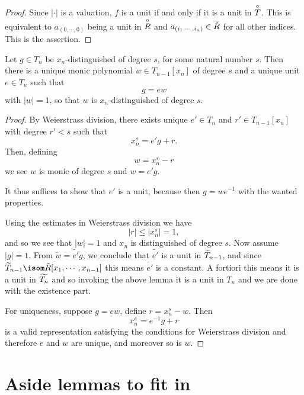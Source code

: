 \begin{proof}
  Since $\lvert \cdot \rvert$ is a valuation, $f$ is a unit if and only if it is a unit in $\overset{\circ}{T}$.
  This is equivalent to $a_{(0, \cdots, 0)}$ being a unit in $\overset{\circ}{R}$ and $a_{(i_1,\cdots, i_n)} \in \check{R}$
  for all other indices. This is the assertion.
\end{proof}


\begin{theorem}
  Let $g \in T_n$ be $x_n$-distinguished of degree $s$, for some natural number $s$. Then there is a
  unique monic polynomial $w \in T_{n-1}[x_n]$ of degree $s$ and a unique unit $e \in T_n$ such that
  \[
    g = e w
  \]
  with $\lvert w \rvert = 1$, so that $w$ is $x_n$-distinguished of degree $s$.
\end{theorem}

\begin{proof}
  By Weierstrass division, there exists unique $e' \in T_n$ and $r' \in T_{n-1} [x_n]$ with degree $r' < s$
  such that
  \[
    x_n^s = e' g + r.
  \]
  Then, defining
  \[
    w = x^s_n - r
  \]
  we see $w$ is monic of degree $s$ and $w = e' g$.

  It thus suffices to show that $e'$ is a unit, because then $g = w e^{-1}$ with the wanted properties.

  Using the estimates in Weierstrass division we have
  \[
    \lvert r \rvert \leq \lvert x_n^s \rvert = 1,
  \]
  and so we see that $\lvert w \rvert = 1$ and $x_n$ is distinguished of degree $s$.
  Now assume $\lvert g \rvert = 1$. From $\tilde{w} = \tilde{e'} \tilde{g}$, we conclude that $\tilde{e'}$
  is a unit in $\widetilde{T}_{n-1}$, and since $\res{T}_{n-1} \isom \tilde{R}[x_1, \cdots, x_{n-1}]$ this means
  $\tilde{e'}$ is a constant.
  A fortiori this means it is a unit in $\widetilde{T_n}$ and so invoking the above lemma it is a unit in $T_n$
  and we are done with the existence part.

  For uniqueness, suppose $g = e w$, define $r = x^s_n - w$. Then
  \[
    x_n^s = e^{-1} g + r
  \]
  is a valid representation satisfying the conditions for Weierstrass division and therefore $e$ and
  $w$ are unique, and moreover so is $w$.
\end{proof}


\section{Aside lemmas to fit in}

